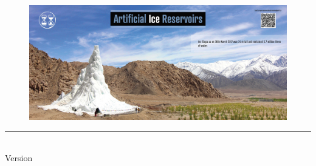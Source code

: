 %
\begin{titlepage}
	\flushright
	\hfill
	\vfill

  \begin{figure}[htb]
  \centering
  \includegraphics[width=\textwidth]{figs/AIR_title.jpg}
  \end{figure}
	{\Large\thesisTitle \par}
	\rule[5pt]{\textwidth}{.4pt} \par
	{\large\thesisName}
	\vfill
	\textit{\large\thesisDate} \\
	Version \thesisVersion
\end{titlepage}


